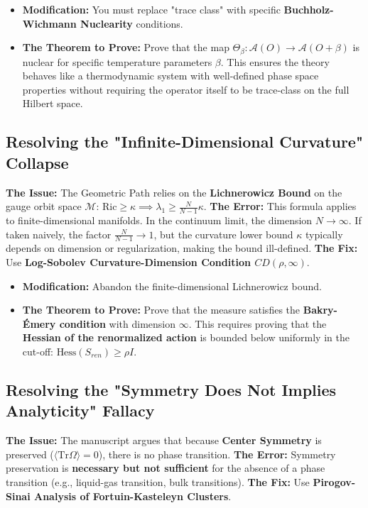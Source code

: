 \begin{itemize}
    \item \textbf{Modification:} You must replace "trace class" with specific \textbf{Buchholz-Wichmann Nuclearity} conditions.
    \item \textbf{The Theorem to Prove:} Prove that the map $\Theta_\beta: \mathcal{A}(O) \to \mathcal{A}(O + \beta)$ is nuclear for specific temperature parameters $\beta$. This ensures the theory behaves like a thermodynamic system with well-defined phase space properties without requiring the operator itself to be trace-class on the full Hilbert space.
\end{itemize}

\subsection{Resolving the "Infinite-Dimensional Curvature" Collapse}
\textbf{The Issue:} The Geometric Path relies on the \textbf{Lichnerowicz Bound} on the gauge orbit space $\mathcal{M}$: $\text{Ric} \ge \kappa \implies \lambda_1 \ge \frac{N}{N-1}\kappa$.
\textbf{The Error:} This formula applies to finite-dimensional manifolds. In the continuum limit, the dimension $N \to \infty$. If taken naively, the factor $\frac{N}{N-1} \to 1$, but the curvature lower bound $\kappa$ typically depends on dimension or regularization, making the bound ill-defined.
\textbf{The Fix:} Use \textbf{Log-Sobolev Curvature-Dimension Condition $CD(\rho, \infty)$}.

\begin{itemize}
    \item \textbf{Modification:} Abandon the finite-dimensional Lichnerowicz bound.
    \item \textbf{The Theorem to Prove:} Prove that the measure satisfies the \textbf{Bakry-Émery condition} with dimension $\infty$. This requires proving that the \textbf{Hessian of the renormalized action} is bounded below uniformly in the cut-off: $\text{Hess}(S_{ren}) \ge \rho I$.
\end{itemize}

\subsection{Resolving the "Symmetry Does Not Implies Analyticity" Fallacy}
\textbf{The Issue:} The manuscript argues that because \textbf{Center Symmetry} is preserved ($\langle \text{Tr} \Omega \rangle = 0$), there is no phase transition.
\textbf{The Error:} Symmetry preservation is \textbf{necessary but not sufficient} for the absence of a phase transition (e.g., liquid-gas transition, bulk transitions).
\textbf{The Fix:} Use \textbf{Pirogov-Sinai Analysis of Fortuin-Kasteleyn Clusters}.


